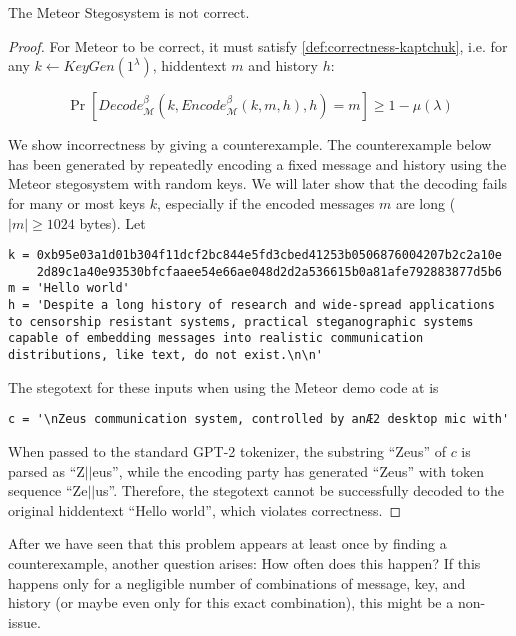 \begin{theorem}
The Meteor Stegosystem is not correct.
\end{theorem}

\begin{proof}
For Meteor to be correct, it must satisfy \autoref{def:correctness-kaptchuk}, i.e. for any $k \leftarrow KeyGen(1^\lambda)$, hiddentext $m$ and history $h$:

$$\mathop{Pr}[Decode_{\mathcal{M}}^\beta(k, Encode_{\mathcal{M}}^\beta(k, m, h), h) = m] \geq 1 - \mu(\lambda)$$

We show incorrectness by giving a counterexample. 
The counterexample below has been generated by repeatedly encoding a fixed message and history using the Meteor stegosystem with random keys.
We will later show that the decoding fails for many or most keys $k$, especially if the encoded messages $m$ are long ($|m| \geq 1024$ bytes).
Let

\begin{lstlisting}[breaklines]
k = 0xb95e03a1d01b304f11dcf2bc844e5fd3cbed41253b0506876004207b2c2a10e
    2d89c1a40e93530bfcfaaee54e66ae048d2d2a536615b0a81afe792883877d5b6
m = 'Hello world'
h = 'Despite a long history of research and wide-spread applications to censorship resistant systems, practical steganographic systems capable of embedding messages into realistic communication distributions, like text, do not exist.\n\n'
\end{lstlisting}

The stegotext for these inputs when using the Meteor demo code at \cite{MeteorDemo2021} is

\begin{lstlisting}
c = '\nZeus communication system, controlled by anÆ2 desktop mic with'
\end{lstlisting}

When passed to the standard GPT-2 tokenizer, the substring ``Zeus'' of $c$ is parsed as ``Z$||$eus'', while the encoding party has generated ``Zeus'' with token sequence ``Ze$||$us''.
Therefore, the stegotext cannot be successfully decoded to the original hiddentext ``Hello world'', which violates correctness.
\end{proof}

After we have seen that this problem appears at least once by finding a counterexample, another question arises:
How often does this happen?
If this happens only for a negligible number of combinations of message, key, and history (or maybe even only for this exact combination), this might be a non-issue.


